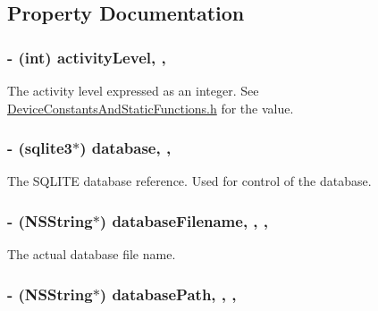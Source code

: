 \subsection{Property Documentation}
\hypertarget{interface_d_b_manager_aff07ccf2439a2df78a5375303d5272a7}{
\subsubsection[{activity\-Level}]{\setlength{\rightskip}{0pt plus 5cm}-\/ (int) activity\-Level\hspace{0.3cm}{\ttfamily [read]}, {\ttfamily [write]}, {\ttfamily [atomic]}}}\label{interface_d_b_manager_aff07ccf2439a2df78a5375303d5272a7}
The activity level expressed as an integer. See \hyperlink{_device_constants_and_static_functions_8h_source}{Device\-Constants\-And\-Static\-Functions.\-h} for the value. \hypertarget{interface_d_b_manager_aa3315763d817eb3c10dac39ee530e2a8}{
\subsubsection[{database}]{\setlength{\rightskip}{0pt plus 5cm}-\/ (sqlite3$\ast$) database\hspace{0.3cm}{\ttfamily [read]}, {\ttfamily [write]}, {\ttfamily [atomic]}}}\label{interface_d_b_manager_aa3315763d817eb3c10dac39ee530e2a8}
The S\-Q\-L\-I\-T\-E database reference. Used for control of the database. \hypertarget{interface_d_b_manager_a725c101d5daf6506b59e0f7e06993982}{
\subsubsection[{database\-Filename}]{\setlength{\rightskip}{0pt plus 5cm}-\/ (N\-S\-String$\ast$) database\-Filename\hspace{0.3cm}{\ttfamily [read]}, {\ttfamily [write]}, {\ttfamily [nonatomic]}, {\ttfamily [strong]}}}\label{interface_d_b_manager_a725c101d5daf6506b59e0f7e06993982}
The actual database file name. \hypertarget{interface_d_b_manager_a15a4e85cdc292d83ee3d8b28e43c43bc}{
\subsubsection[{database\-Path}]{\setlength{\rightskip}{0pt plus 5cm}-\/ (N\-S\-String$\ast$) database\-Path\hspace{0.3cm}{\ttfamily [read]}, {\ttfamily [write]}, {\ttfamily [nonatomic]}, {\ttfamily [strong]}}}\label{interface_d_b_manager_a15a4e85cdc292d83ee3d8b28e43c43bc}
